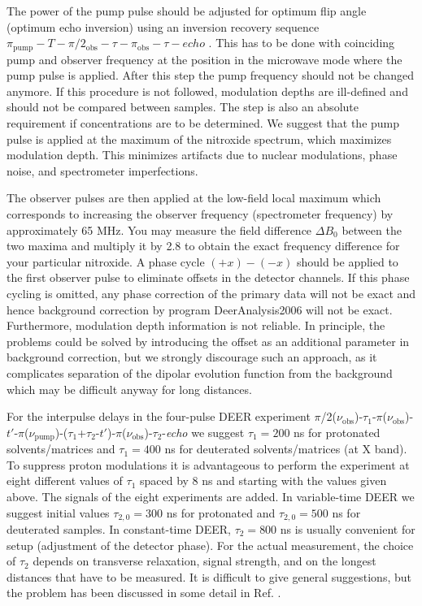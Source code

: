 \documentclass{article}
\begin{document}
The power of the pump pulse should be adjusted for optimum flip angle (optimum echo inversion) using an inversion recovery sequence $\pi_{\mathrm{pump}}-T-\pi/2_\mathrm{obs}-\tau-\pi_{\mathrm{obs}}-\tau-echo$ . This has to be done with coinciding pump and observer frequency at the position in the microwave mode where the pump pulse is applied. After this step the pump frequency should not be changed anymore. If this procedure is not followed, modulation depths are ill-defined and should not be compared between samples. The step is also an absolute requirement if concentrations are to be determined. We suggest that the pump pulse is applied at the maximum of the nitroxide spectrum, which maximizes modulation depth. This minimizes artifacts due to nuclear modulations, phase noise, and spectrometer imperfections.

The observer pulses are then applied at the low-field local maximum which corresponds to increasing the observer frequency (spectrometer frequency) by approximately 65 MHz. You may measure the field difference $\Delta B_{0}$ between the two maxima and multiply it by 2.8 to obtain the exact frequency difference for your particular nitroxide. A phase cycle $(+x)-(-x)$ should be applied to the first observer pulse to eliminate offsets in the detector channels. If this phase cycling is omitted, any phase correction of the primary data will not be exact and hence background correction by program DeerAnalysis2006 will not be exact. Furthermore, modulation depth information is not reliable. In principle, the problems could be solved by introducing the offset as an additional parameter in background correction, but we strongly discourage such an approach, as it complicates separation of the dipolar evolution function from the background which may be difficult anyway for long distances.

For the interpulse delays in the four-pulse DEER experiment $\pi$/2($\nu_{\mathrm{obs}}$)-$\tau_{1}$-$\pi$($\nu_{\mathrm{obs}}$)-$t'$-$\pi$($\nu_{\mathrm{pump}}$)-($\tau_{1}$+$\tau_{2}$-$t'$)-$\pi$($\nu_{\mathrm{obs}}$)-$\tau_{2}$-{\em echo} we suggest $\tau_{1} = 200$ ns for protonated solvents/matrices and $\tau_{1} = 400$ ns for deuterated solvents/matrices (at X band). To suppress proton modulations it is advantageous to perform the experiment at eight different values of $\tau_{1}$ spaced by 8 ns and starting with the values given above. The signals of the eight experiments are added. In variable-time DEER \cite{jeschke2004b} we suggest initial values $\tau_{2,0}= 300$ ns for protonated and $\tau_{2,0}= 500$ ns for deuterated samples. In constant-time DEER, $\tau_{2} = 800$ ns is usually convenient for setup (adjustment of the detector phase). For the actual measurement, the choice of $\tau_{2}$ depends on transverse relaxation, signal strength, and on the longest distances that have to be measured. It is difficult to give general suggestions, but the problem has been discussed in some detail in Ref. \cite{jeschke2004b}.
\end{document}
